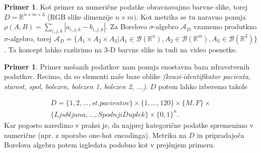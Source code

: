 \documentclass[12pt,a4paper]{amsart}
\theoremstyle{definition} %
\newtheorem{primer}[definicija]{Primer}
\theoremstyle{plain} %
\begin{document}
\begin{primer} Kot primer za numerične podatke obravnavajmo barvne slike, torej $D = \mathbb{R}^{n\times m \times 3}$ (RGB slike dimenzije $n \times m)$. Kot metrika se tu naravno ponuja $\rho(A,B)=\sum_{i,j,k}  |a_{i,j,k}-b_{i,j,k}|$. Za Borelovo $\sigma$-algebro $\mathcal{A}_{D}$  vzamemo produtkno $\sigma$-algebro, torej  $\mathcal{A}_{D}=\{A_{1} \times A_{2} \times A_{3} | A_{1} \in \mathcal{B}(\mathbb{R}^n),  A_{2} \in \mathcal{B}(\mathbb{R}^m),  A_{3} \in \mathcal{B}(\mathbb{R}^3) \}$. Ta koncept lahko razširimo na 3-D barvne slike in tudi na video posnetke.
\end{primer}

\begin{primer} Primer mešanih podatkov nam ponuja enostavna baza zdravstvenih podatkov. Recimo, da so elementi naše baze oblike \textit{(kvazi-identifikator pacienta, starost, spol, bolezen, bolezen 1, bolezen 2, ...)}. $D$ potem lahko izberemo takole 

\begin{equation*}
\begin{split}
D=\{1,2,...,st. pacientov\} \times \{1,...,120\} \times \{M,F\} \times \\
\{Ljubljana, ... , Spodnji Duplek\} \times \{0,1\}^n.
\end{split}
\end{equation*}
Kar pogosto naredimo v praksi je, da najprej kategorične podatke spremenimo v numerične (npr. z uporabo one-hot encodinga). Metrika na $D$ in pripradajoča Borelova algebra potem izgledata podobno kot v prejšnjem primeru.
\end{primer}
\end{document}
